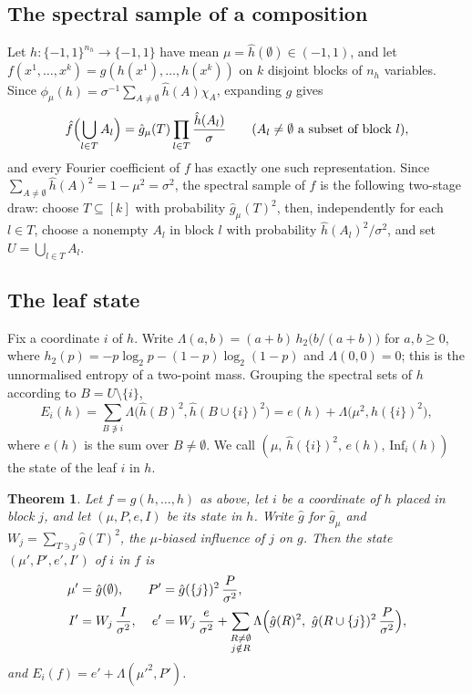\documentclass[11pt]{amsart}
\newtheorem{theorem}{Theorem}[section]
\theoremstyle{definition}
\theoremstyle{remark}
\newcommand{\Inf}{\mathrm{Inf}}
\begin{document}
\subsection{The spectral sample of a composition}
Let $h:\{-1,1\}^{n_h}\to\{-1,1\}$ have mean $\mu=\hat h(\emptyset)\in(-1,1)$, and let
$f(x^1,\dots,x^k)=g(h(x^1),\dots,h(x^k))$ on $k$ disjoint blocks of $n_h$ variables. Since
$\phi_\mu(h)=\sigma^{-1}\sum_{A\ne\emptyset}\hat h(A)\chi_A$, expanding $g$ gives
\[
\hat f\Bigl(\bigcup_{l\in T}A_l\Bigr)=\hat g_\mu(T)\prod_{l\in T}\frac{\hat h(A_l)}{\sigma}
\qquad(A_l\ne\emptyset\text{ a subset of block }l),
\]
and every Fourier coefficient of $f$ has exactly one such representation. Since
$\sum_{A\ne\emptyset}\hat h(A)^2=1-\mu^2=\sigma^2$, the spectral sample of $f$ is the following two-stage draw: choose
$T\subseteq[k]$ with probability $\hat g_\mu(T)^2$, then, independently for each $l\in T$, choose a nonempty
$A_l$ in block $l$ with probability $\hat h(A_l)^2/\sigma^2$, and set $U=\bigcup_{l\in T}A_l$.

\subsection{The leaf state}
Fix a coordinate $i$ of $h$. Write $\Lambda(a,b)=(a+b)\,h_2\bigl(b/(a+b)\bigr)$ for $a,b\ge 0$, where
$h_2(p)=-p\log_2p-(1-p)\log_2(1-p)$ and $\Lambda(0,0)=0$; this is the unnormalised entropy of a two-point mass. Grouping
the spectral sets of $h$ according to $B=U\setminus\{i\}$,
\begin{equation}\label{eq:Esplit}
E_i(h)=\sum_{B\not\ni i}\Lambda\bigl(\hat h(B)^2,\hat h(B\cup\{i\})^2\bigr)=e(h)+\Lambda\bigl(\mu^2,\hat h(\{i\})^2\bigr),
\end{equation}
where $e(h)$ is the sum over $B\ne\emptyset$. We call $(\mu,\,\hat h(\{i\})^2,\,e(h),\,\Inf_i(h))$ the state of the
leaf $i$ in $h$.

\begin{theorem}\label{thm:comp}
Let $f=g(h,\dots,h)$ as above, let $i$ be a coordinate of $h$ placed in block $j$, and let $(\mu,P,e,I)$ be its
state in $h$. Write $\hat g$ for $\hat g_\mu$ and $W_j=\sum_{T\ni j}\hat g(T)^2$, the $\mu$-biased influence of $j$
on $g$. Then the state $(\mu',P',e',I')$ of $i$ in $f$ is
\begin{align*}
\mu'&=\hat g(\emptyset), & P'&=\hat g(\{j\})^2\,\frac{P}{\sigma^2},\\
I'&=W_j\,\frac{I}{\sigma^2}, & e'&=W_j\,\frac{e}{\sigma^2}
+\sum_{\substack{R\ne\emptyset\\ j\notin R}} \Lambda\Bigl(\hat g(R)^2,\ \hat g(R\cup\{j\})^2\,\frac{P}{\sigma^2}\Bigr),
\end{align*}
and $E_i(f)=e'+\Lambda(\mu'^2,P')$.
\end{theorem}
\end{document}
